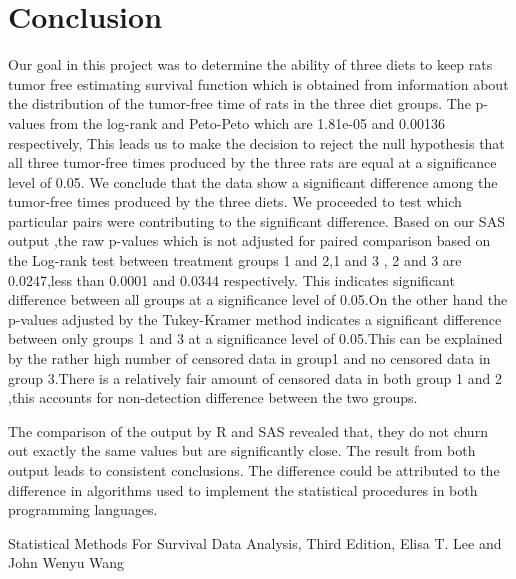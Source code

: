 \documentclass[11pt]{article}
\numberwithin{figure}{section}
\begin{document}
\section{Conclusion}
Our goal in this project was to determine the ability of three diets to keep rats tumor free estimating survival function which is obtained from information about the distribution of the tumor-free time of rats in the three diet groups. 
The p-values from the log-rank and Peto-Peto which are 1.81e-05 and 0.00136 respectively, This leads us to make the decision to reject the null hypothesis that all three tumor-free times produced by the three rats   are equal at a significance level of 0.05. We conclude that the data show a significant difference among the tumor-free times produced by the three diets.
We proceeded to test which particular pairs were contributing to the significant difference. Based on our SAS output ,the raw p-values which is not adjusted for paired comparison based on the Log-rank test  between treatment groups  1 and 2,1 and 3 , 2 and 3 are 0.0247,less than 0.0001 and 0.0344 respectively. This indicates significant difference between all groups at a significance level of 0.05.On the other hand the p-values adjusted by the Tukey-Kramer method  indicates a significant difference between only groups 1 and 3 at a significance level of 0.05.This can be explained by the rather high number of censored data in group1 and no censored data in group 3.There is a relatively fair amount of censored data in both group 1 and 2 ,this accounts for non-detection  difference  between the two groups.

The comparison of the output by R and SAS revealed that, they do not churn out exactly the same values but are significantly close. The result from both output leads to consistent conclusions. The difference could be attributed to the difference in algorithms used to implement the statistical procedures in both programming languages.



\newpage
\begin{thebibliography}{100}

Statistical Methods For Survival Data Analysis, Third Edition, Elisa T. Lee and John Wenyu Wang


\end{thebibliography}
\end{document}
